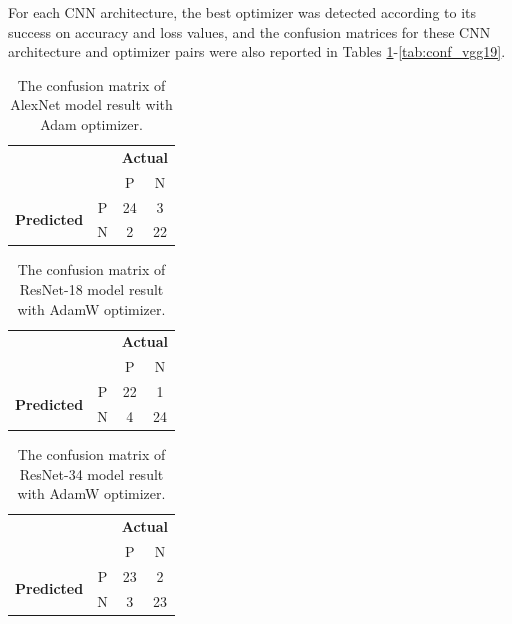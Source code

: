 For each CNN architecture, the best optimizer was detected according to its success on accuracy and loss values, and the confusion matrices for these CNN architecture and optimizer pairs were also reported in Tables \ref{tab:conf_alexnet}-\ref{tab:conf_vgg19}.

\begin{table}[!h]
	\centering
	\caption{The confusion matrix of AlexNet model result with Adam optimizer.}
	\label{tab:conf_alexnet}
	\begin{tabular}{|cc|c|c|}
		\cline{1-4}
		&   & \multicolumn{2}{c|}{\textbf{Actual}} \\ \cline{3-4} 
		&   & P            & N            \\ \hline
		\multicolumn{1}{|c|}{\multirow{2}{*}{\textbf{Predicted}}} & P & 24           & 3            \\ \cline{2-4} 
		\multicolumn{1}{|c|}{}                           & N & 2            & 22           \\ \hline
	\end{tabular}
\end{table}

\begin{table}[!h]
	\centering
	\caption{The confusion matrix of ResNet-18 model result with AdamW optimizer.}
	\label{tab:conf_resnet18}
	\begin{tabular}{|cc|c|c|}
		\cline{1-4}
		&   & \multicolumn{2}{c|}{\textbf{Actual}} \\ \cline{3-4} 
		&   & P            & N            \\ \hline
		\multicolumn{1}{|c|}{\multirow{2}{*}{\textbf{Predicted}}} & P & 22           & 1            \\ \cline{2-4} 
		\multicolumn{1}{|c|}{}                           & N & 4            & 24           \\ \hline
	\end{tabular}
\end{table}

\begin{table}[!h]
	\centering
	\caption{The confusion matrix of ResNet-34 model result with AdamW optimizer.}
	\label{tab:conf_resnet34}
	\begin{tabular}{|cc|c|c|}
		\cline{1-4}
		&   & \multicolumn{2}{c|}{\textbf{Actual}} \\ \cline{3-4} 
		&   & P            & N            \\ \hline
		\multicolumn{1}{|c|}{\multirow{2}{*}{\textbf{Predicted}}} & P & 23           & 2            \\ \cline{2-4} 
		\multicolumn{1}{|c|}{}                           & N & 3            & 23           \\ \hline
	\end{tabular}
\end{table}


